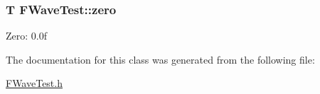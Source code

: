 \subsubsection[{zero}]{\setlength{\rightskip}{0pt plus 5cm}T F\+Wave\+Test\+::zero\hspace{0.3cm}{\ttfamily [private]}}\label{classFWaveTest_af8ee955bb870476ec60bd3eabd93434f}
Zero\+: 0.\+0f 

The documentation for this class was generated from the following file\+:\begin{DoxyCompactItemize}
\item 
\hyperlink{FWaveTest_8h}{F\+Wave\+Test.\+h}\end{DoxyCompactItemize}
